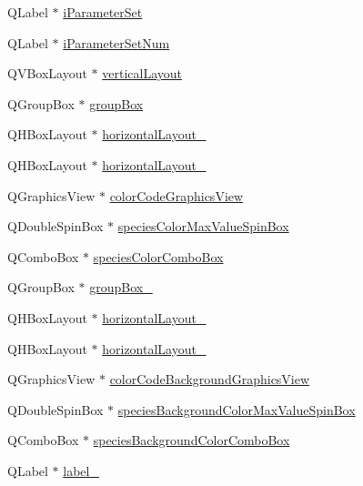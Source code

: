 \begin{DoxyCompactItemize}
\-Q\-Label $\ast$ \hyperlink{class_ui___main_window_a4f1de3b858235bda33821eb68eb5a15b}{i\-Parameter\-Set}
\item 
\-Q\-Label $\ast$ \hyperlink{class_ui___main_window_a3f5d3def30871b917c64c2084368c320}{i\-Parameter\-Set\-Num}
\item 
\-Q\-V\-Box\-Layout $\ast$ \hyperlink{class_ui___main_window_aecd96a04789fcfec3f98d80390ad8184}{vertical\-Layout}
\item 
\-Q\-Group\-Box $\ast$ \hyperlink{class_ui___main_window_aef7cb3be8cecfc9aaf98f036a98781ce}{group\-Box}
\item 
\-Q\-H\-Box\-Layout $\ast$ \hyperlink{class_ui___main_window_a14c9d4842c3e97e16e7873ef0aecdb1e}{horizontal\-Layout\-\_}
\item 
\-Q\-H\-Box\-Layout $\ast$ \hyperlink{class_ui___main_window_a80867018070156432923d0266cc9fe25}{horizontal\-Layout\-\_}
\item 
\-Q\-Graphics\-View $\ast$ \hyperlink{class_ui___main_window_a9d358977cfd4428817e8ec8e76084d5a}{color\-Code\-Graphics\-View}
\item 
\-Q\-Double\-Spin\-Box $\ast$ \hyperlink{class_ui___main_window_a630d229a0c27bca9e8fa65c926ac9f82}{species\-Color\-Max\-Value\-Spin\-Box}
\item 
\-Q\-Combo\-Box $\ast$ \hyperlink{class_ui___main_window_a42def65165da6f0f6972d863ce6fe411}{species\-Color\-Combo\-Box}
\item 
\-Q\-Group\-Box $\ast$ \hyperlink{class_ui___main_window_abb28acde35ffce4d0e6152579df2cbc3}{group\-Box\-\_}
\item 
\-Q\-H\-Box\-Layout $\ast$ \hyperlink{class_ui___main_window_ae183387a7d233b437a637b403ba39ffd}{horizontal\-Layout\-\_}
\item 
\-Q\-H\-Box\-Layout $\ast$ \hyperlink{class_ui___main_window_a03ce63974cc69b067c91bbf285cceca8}{horizontal\-Layout\-\_}
\item 
\-Q\-Graphics\-View $\ast$ \hyperlink{class_ui___main_window_a6514b2e16b9ea2f879bde5976b215e9b}{color\-Code\-Background\-Graphics\-View}
\item 
\-Q\-Double\-Spin\-Box $\ast$ \hyperlink{class_ui___main_window_a54a465855ecd4ab2fe51bdad8f2d0c81}{species\-Background\-Color\-Max\-Value\-Spin\-Box}
\item 
\-Q\-Combo\-Box $\ast$ \hyperlink{class_ui___main_window_ac3c8d5fa9d1ee6504fb0c77918c8e3bf}{species\-Background\-Color\-Combo\-Box}
\item 
\-Q\-Label $\ast$ \hyperlink{class_ui___main_window_a2e2516d755e4dd53fc905dabddf2738a}{label\-\_}

\end{DoxyCompactItemize}
